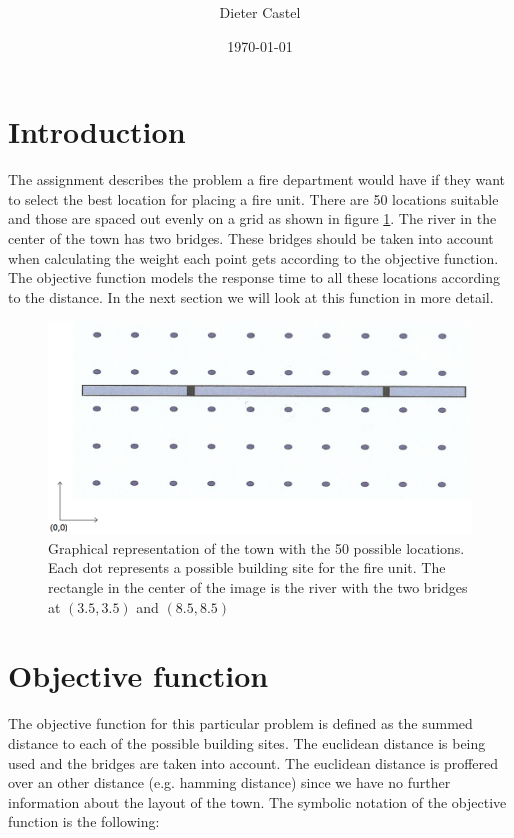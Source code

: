 \documentclass[11pt,a4paper,oneside]{article}
\title{\maintitle \\ \teacherstitle}
\date{\today}
\author{Dieter Castel}
\begin{document}
\maketitle
\tableofcontents
\newpage

\section{Introduction}
The assignment describes the problem a fire department would have if they want to select the best location for placing a fire unit.
There are 50 locations suitable and those are spaced out evenly on a grid as shown in figure \ref{fig:assig}.
The river in the center of the town has two bridges.
These bridges should be taken into account when calculating the weight each point gets according to the objective function.
The objective function models the response time to all these locations according to the distance. In the next section we will look at this function in more detail.
\begin{figure}
		\centering
		\includegraphics[scale=0.3]{assignment.png}
		\caption{Graphical representation of the town with the 50 possible locations. Each dot represents a possible building site for the fire unit. The rectangle in the center of the image is the river with the two bridges at $(3.5,3.5)$ and $(8.5,8.5)$}
		\label{fig:assig}
\end{figure}

\section{Objective function}
The objective function for this particular problem is defined as the summed distance to each of the possible building sites.
The euclidean distance is being used and the bridges are taken into account.
The euclidean distance is proffered over an other distance (e.g. hamming distance) since we have no further information about the layout of the town.
The symbolic notation of the objective function is the following:
\end{document}
